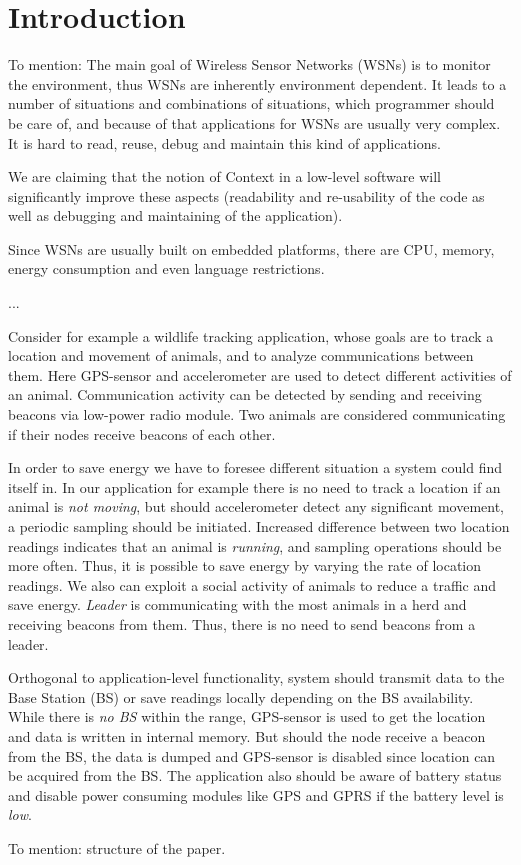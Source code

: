 \section{Introduction}
To mention: The main goal of Wireless Sensor Networks (WSNs) is to monitor the environment, thus WSNs are inherently environment dependent. It leads to a number of situations and combinations of situations, which programmer should be care of, and because of that applications for WSNs are usually very complex. It is hard to read, reuse, debug and maintain this kind of applications.

We are claiming that the notion of Context in a low-level software will significantly improve these aspects (readability and re-usability of the code as well as debugging and maintaining of the application).

Since WSNs are usually built on embedded platforms, there are CPU, memory, energy consumption and even language restrictions.

...

Consider for example a wildlife tracking application\cite{pasztor10}, whose goals are to track a location and movement of animals, and to analyze communications between them. Here GPS-sensor and accelerometer are used to detect different activities of an animal. Communication activity can be detected by sending and receiving beacons via low-power radio module. Two animals are considered communicating if their nodes receive beacons of each other.

In order to save energy we have to foresee different situation a system could find itself in. In our application for example there is no need to track a location if an animal is \emph{not moving}, but should accelerometer detect any significant movement, a periodic sampling should be initiated. Increased difference between two location readings indicates that an animal is \emph{running}, and sampling operations should be more often. Thus, it is possible to save energy by varying the rate of location readings. We also can exploit a social activity of animals to reduce a traffic and save energy. \emph{Leader} is communicating with the most animals in a herd and receiving beacons from them. Thus, there is no need to send beacons from a leader.

Orthogonal to application-level functionality, system should transmit data to the Base Station (BS) or save readings locally depending on the BS availability. While there is \emph{no BS} within the range, GPS-sensor is used to get the location and data is written in internal memory. But should the node receive a beacon from the BS, the data is dumped and GPS-sensor is disabled since location can be acquired from the BS. The application also should be aware of battery status and disable power consuming modules like GPS and GPRS if the battery level is \emph{low}.

To mention: structure of the paper.
